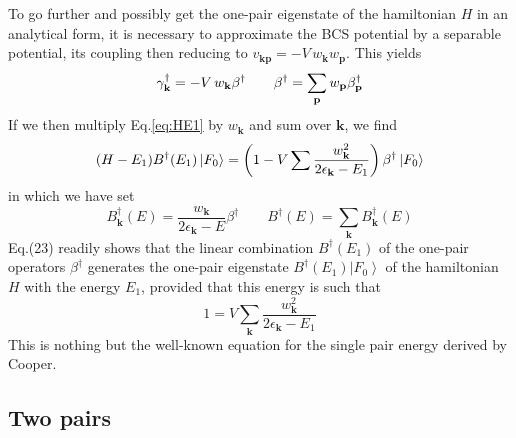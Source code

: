 \documentclass[aps,prb,superscriptaddress,twocolumn]{revtex4}
\newcommand{\vk}{\ensuremath{\mathbf{k}}}
\newcommand{\vp}{\ensuremath{\mathbf{p}}}
\begin{document}
To go further and possibly get the one-pair eigenstate of the hamiltonian $H$
in an analytical form, it is necessary to approximate the BCS potential by a separable potential, its
coupling then reducing to $v_{\mathbf{k} \mathbf{p} }=-V\,w_\vk{}w_\vp$.
This yields 
\begin{equation}  \label{eq:gammaBeta}
\gamma^{\dagger}_\vk=-V\,w_\vk\beta^{\dagger}\quad\quad\beta^{\dagger}=\sum_%
\vp{}w_\vp\beta^{\dagger}_\vp
\end{equation}
If we then multiply Eq.\eqref{eq:HE1} by $w_\vk$ and sum over $\mathbf{k} $,
we find 
\begin{equation}
(H-E _1)B^{\dagger}(E _1)\left|F_0\right>  =\left(1-V\sum{%
\frac{w_\vk^2}{2\epsilon_\vk-E _1}}\right)
\beta^{\dagger}\left|F_0\right>  
\end{equation}
in which we have set 
\begin{equation}  \label{eq:B}
B_\vk^{\dagger}(E)=\frac{w_\vk}{2\epsilon_\vk-E}\beta^{\dagger}\quad\quad
B^{\dagger}(E)=\sum_\vk{B_\vk^{\dagger}(E)}
\end{equation}
Eq.(23) readily shows that the linear combination $B^{\dagger}(E _1)
$ of the one-pair operators $\beta^{\dagger}$ generates the one-pair eigenstate $B^{\dagger}(%
E _1)\left|F_0\right>  $ of the hamiltonian $H$ with the energy $%
E _1$, provided that this energy is such that 
\begin{equation}  \label{eq:SchOne}
1=V\sum_\vk{\frac{w_\vk^2}{2\epsilon_\vk-E _1}}
\end{equation}
This is nothing but the well-known equation for the single pair energy
derived by Cooper.

\subsection{Two pairs}
\end{document}
